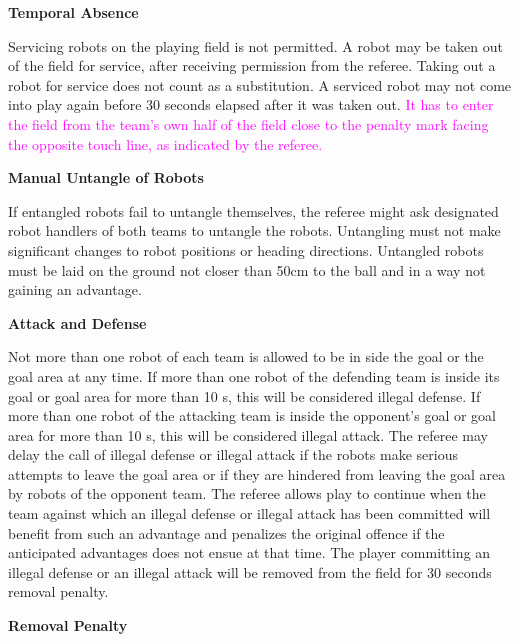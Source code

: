 \bigskip

{\bfseries Temporal Absence}

Servicing robots on the playing field is not permitted. A robot may be taken out of the field for service, after receiving permission from the referee. Taking out a robot for service does not count as a substitution. A serviced robot may not come into play again before 30 seconds elapsed after it was taken out. \textcolor{magenta}{It has to enter the field from the team's own half of the field close to the penalty mark facing the opposite touch line, as indicated by the referee.}

\bigskip

{\bfseries Manual Untangle of Robots}

If entangled robots fail to untangle themselves, the referee might ask designated robot handlers of both teams to untangle the robots. Untangling must not make
significant changes to robot positions or heading directions. Untangled robots must be laid on the ground not closer than 50cm to the ball and in a way not gaining an advantage.

\bigskip

{\bfseries Attack and Defense}

Not more than one robot of each team is allowed to be in
side the goal or the goal area at any time. If more than one robot of the defending team is inside its goal or goal area for more than 10 s, this will be considered illegal defense. If more than one robot of the attacking team is inside the opponent's goal or goal area for more than 10 s, this will be considered illegal attack. The referee may delay the call of illegal defense
or illegal attack if the robots make serious attempts to leave the goal area or if they are hindered from leaving the goal area by robots of the opponent team. The referee allows play to continue when the team against
which an illegal defense or illegal attack has been committed will benefit from such an advantage and penalizes the original offence if the anticipated advantages does not ensue at that time. The player committing an illegal defense or an illegal attack will be removed from the field for 30 seconds removal penalty.

\bigskip

{\bfseries Removal Penalty}

